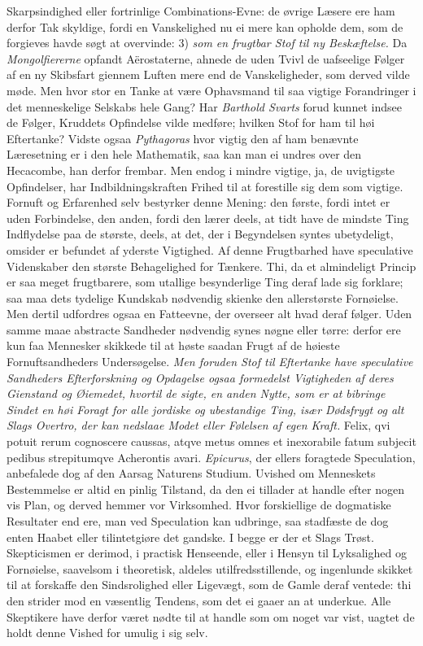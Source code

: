 \documentclass[12pt,a4paper]{article}
\newcommand{\opage}[1]{\marginnote{\footnotesize\textit{[#1]}}}
\begin{document}
Skarpsindighed eller fortrinlige Combinations-Evne: de øvrige Læsere ere ham derfor Tak
skyldige, fordi en Vanskelighed nu ei mere kan opholde dem, som de forgieves havde søgt at
overvinde: 3) \emph{som en frugtbar Stof til
\opage{249} ny Beskæftelse.} Da \emph{Mongolfiererne} opfandt Aërostaterne, ahnede de uden Tvivl de
uafseelige Følger af en ny Skibsfart giennem Luften mere end de Vanskeligheder, som derved
vilde møde. Men hvor stor en Tanke at være Ophavsmand til saa vigtige Forandringer i det
menneskelige Selskabs hele Gang? Har \emph{Barthold Svarts} forud kunnet indsee de Følger,
Kruddets Opfindelse vilde medføre; hvilken Stof for ham til høi Eftertanke? Vidste ogsaa
\emph{Pythagoras} hvor vigtig den af ham benævnte Læresetning er i den hele Mathematik, saa
kan man ei undres over den Hecacombe, han derfor frembar. Men endog i mindre vigtige, ja,
de uvigtigste Opfindelser, har Indbildningskraften Frihed til at forestille sig dem som
vigtige. Fornuft og Erfarenhed selv bestyrker denne Mening: den første, fordi intet er uden
Forbindelse, den anden, fordi den lærer deels, at tidt have de mindste Ting Indflydelse paa
de største, deels, at det, der i Begyndelsen syntes ubetydeligt, omsider er befundet af
yderste Vigtighed. Af denne Frugtbarhed have speculative Videnskaber den største
Behagelighed for Tænkere. Thi, da et almindeligt Princip er saa meget frugtbarere, som
utallige besynderlige Ting deraf lade sig forklare; saa maa dets tydelige Kundskab
nødvendig skienke den allerstørste Fornøielse. Men dertil udfordres ogsaa en Fatteevne, der
overseer alt hvad deraf følger. Uden samme maae abstracte Sandheder nødvendig synes nøgne
eller
\opage{250} tørre: derfor ere kun faa Mennesker skikkede til at høste saadan Frugt af de høieste
Fornuftsandheders Undersøgelse. \emph{Men foruden Stof til Eftertanke have speculative
Sandheders Efterforskning og Opdagelse ogsaa formedelst Vigtigheden af deres Gienstand og
Øiemedet, hvortil de sigte, en anden Nytte, som er at bibringe Sindet en høi Foragt for
alle jordiske og ubestandige Ting, især Dødsfrygt og alt Slags Overtro, der kan nedslaae
Modet eller Følelsen af egen Kraft.} Felix, qvi potuit rerum cognoscere caussas, atqve
metus omnes et inexorabile fatum subjecit pedibus strepitumqve Acherontis avari.
\emph{Epicurus}, der ellers foragtede Speculation, anbefalede dog af den Aarsag Naturens
Studium. Uvished om Menneskets Bestemmelse er altid en pinlig Tilstand, da den ei tillader
at handle efter nogen vis Plan, og derved hemmer vor Virksomhed. Hvor forskiellige de
dogmatiske Resultater end ere, man ved Speculation kan udbringe, saa stadfæste de dog enten
Haabet eller tilintetgiøre det gandske. I begge er der et Slags Trøst. Skepticismen er
derimod, i practisk Henseende, eller i Hensyn til Lyksalighed og Fornøielse, saavelsom i
theoretisk, aldeles utilfredsstillende, og ingenlunde skikket til at forskaffe den
Sindsrolighed eller Ligevægt, som de Gamle deraf ventede: thi den strider mod en væsentlig
Tendens, som
\opage{251} det ei gaaer an at underkue. Alle Skeptikere have derfor været nødte til at handle som om
noget var vist, uagtet de holdt denne Vished for umulig i sig selv.
\end{document}
